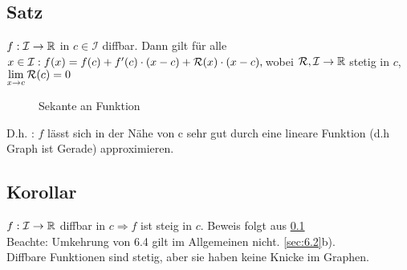 \subsection[Satz]{Satz}\label{sec:6.3}
$f: \mathcal{I} \to \mathbb{R} $ in $c \in \mathcal{I}$ diffbar.
Dann gilt für alle $x \in \mathcal{I}:\\
f(x) = f(c) + f'(c) \cdot (x-c) + \mathcal{R}(x) \cdot (x-c), \,\\
$wobei $\mathcal{R}, \mathcal{I} \to \mathbb{R}$ stetig in $c$, $\displaystyle \lim_{x \to c}\mathcal{R}(c) = 0$\\
\begin{figure}[h!]
\centering
{}
\caption{Sekante an Funktion}
\end{figure}
D.h. : $f$ lässt sich in der Nähe von c sehr gut durch eine lineare Funktion (d.h Graph ist Gerade) approximieren.
\subsection{Korollar}\label{sec:6.4}
$f : \mathcal{I} \to \mathbb{R}$ diffbar in $c
\Rightarrow f$ ist steig in $c$.
Beweis folgt aus \ref{sec:6.3}\\
Beachte: Umkehrung von 6.4 gilt im Allgemeinen nicht. \ref{sec:6.2}b).\\
Diffbare Funktionen sind stetig, aber sie haben keine Knicke im Graphen.
